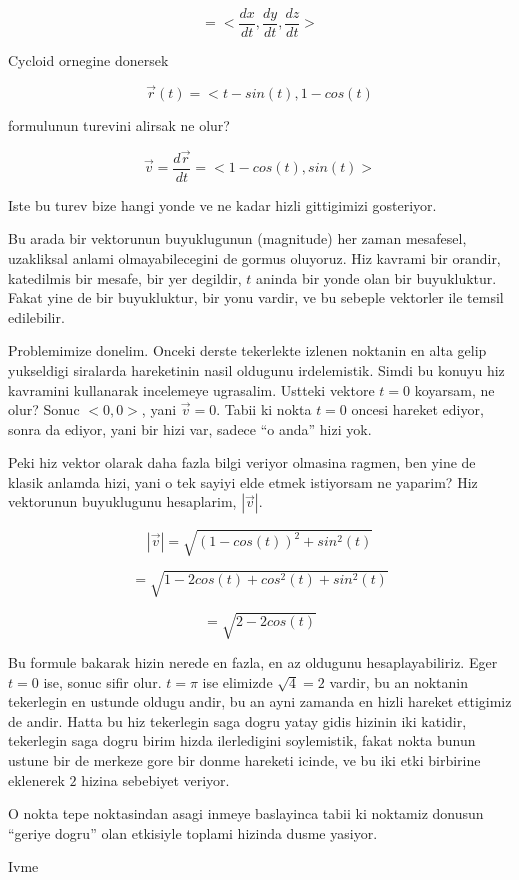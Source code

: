 \documentclass[12pt,fleqn]{article}
\begin{document}
\[ =
<\frac{dx}{dt}, \frac{dy}{dt}, \frac{dz}{dt}>
\]


Cycloid ornegine donersek

\[ \vec{r}(t) = <t-sin(t), 1-cos(t) \]

formulunun turevini alirsak ne olur? 

\[ \vec{v} = \frac{d\vec{r}}{dt} = <1-cos(t),sin(t)>\]

Iste bu turev bize hangi yonde ve ne kadar hizli gittigimizi gosteriyor. 

Bu arada bir vektorunun buyuklugunun (magnitude) her zaman mesafesel,
uzakliksal anlami olmayabilecegini de gormus oluyoruz. Hiz kavrami bir
orandir, katedilmis bir mesafe, bir yer degildir, $t$ aninda bir yonde olan
bir buyukluktur. Fakat yine de bir buyukluktur, bir yonu vardir, ve bu
sebeple vektorler ile temsil edilebilir. 

Problemimize donelim. Onceki derste tekerlekte izlenen noktanin en alta gelip
yukseldigi siralarda hareketinin nasil oldugunu irdelemistik. Simdi bu
konuyu hiz kavramini kullanarak incelemeye ugrasalim. Ustteki vektore $t=0$
koyarsam, ne olur? Sonuc $<0,0>$, yani $\vec{v} = 0$. Tabii ki nokta $t=0$
oncesi hareket ediyor, sonra da ediyor, yani bir hizi var, sadece ``o
anda'' hizi yok. 

Peki hiz vektor olarak daha fazla bilgi veriyor olmasina ragmen, ben yine
de klasik anlamda hizi, yani o tek sayiyi elde etmek istiyorsam ne yaparim?
Hiz vektorunun buyuklugunu hesaplarim, $|\vec{v}|$. 

\[ |\vec{v}| = \sqrt{ (1-cos(t))^2 + sin^2(t) } \]


\[ = \sqrt{ 1-2cos(t) + cos^2(t) + sin^2(t)  } \]


\[ = \sqrt{ 2-2cos(t) } \]


Bu formule bakarak hizin nerede en fazla, en az oldugunu
hesaplayabiliriz. Eger $t=0$ ise, sonuc sifir olur. $t=\pi$ ise elimizde
$\sqrt{4} = 2$ vardir, bu an noktanin tekerlegin en ustunde oldugu andir,
bu an ayni zamanda en hizli hareket ettigimiz de andir. Hatta bu hiz
tekerlegin saga dogru yatay gidis hizinin iki katidir, tekerlegin saga
dogru birim hizda ilerledigini soylemistik, fakat nokta bunun ustune bir de
merkeze gore bir donme hareketi icinde, ve bu iki etki birbirine eklenerek
$2$ hizina sebebiyet veriyor.

O nokta tepe noktasindan asagi inmeye baslayinca tabii ki noktamiz donusun
``geriye dogru'' olan etkisiyle toplami hizinda dusme yasiyor.

Ivme
\end{document}
